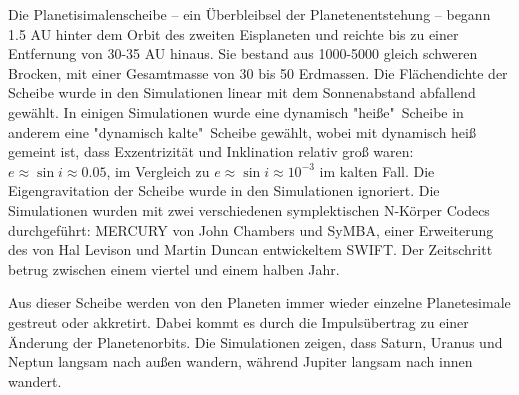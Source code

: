 \documentclass[10pt,a4paper,twoside]{article}
\begin{document}
Die Planetisimalenscheibe – ein Überbleibsel der Planetenentstehung – begann 1.5 AU hinter dem Orbit des zweiten Eisplaneten und reichte bis zu einer Entfernung von 30-35 AU hinaus\cite{Tsiganis2005}\cite{Levison2008}. Sie bestand aus 1000-5000 gleich schweren Brocken, mit einer Gesamtmasse von 30 bis 50 Erdmassen. %
Die Flächendichte der Scheibe wurde in den Simulationen linear mit dem Sonnenabstand abfallend gewählt. In einigen Simulationen wurde eine dynamisch "heiße"\ Scheibe in anderem eine "dynamisch kalte"\ Scheibe gewählt, wobei mit dynamisch heiß gemeint ist, dass Exzentrizität und Inklination relativ groß waren: $e \approx \sin i \approx 0.05 $, im Vergleich zu $e \approx \sin i \approx 10^{-3} $ im kalten Fall.\cite{Tsiganis2005}
Die Eigengravitation der Scheibe wurde in den Simulationen ignoriert\cite{Tsiganis2005}.
Die Simulationen wurden mit zwei verschiedenen symplektischen N-Körper Codecs durchgeführt: MERCURY von John Chambers und SyMBA, einer Erweiterung des von Hal Levison und Martin Duncan entwickeltem SWIFT.
Der Zeitschritt betrug zwischen einem viertel und einem halben Jahr.\cite{Tsiganis2005} %

Aus dieser Scheibe werden von den Planeten immer wieder einzelne Planetesimale gestreut oder akkretirt. Dabei kommt es durch die Impulsübertrag zu einer Änderung der Planetenorbits\cite{Tsiganis2005}. %
Die Simulationen zeigen, dass Saturn, Uranus und Neptun langsam nach außen wandern, während Jupiter langsam nach innen wandert\cite{Tsiganis2005}\cite{Hahn1999}. %
\end{document}
